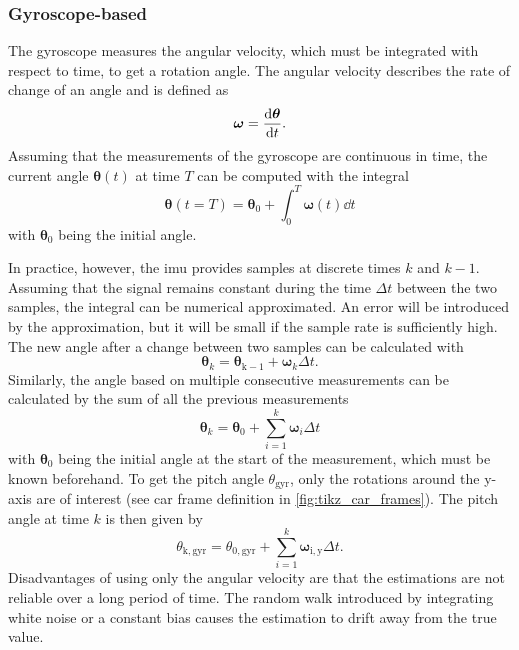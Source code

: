 \subsubsection{Gyroscope-based}
The gyroscope measures the angular velocity, which must be integrated with respect to time, to get a rotation angle.
The angular velocity describes the rate of change of an angle and is defined as
\begin{equation}
    \boldsymbol{\omega}  =  \dv{\boldsymbol{\theta}}{t}.
\end{equation}
Assuming that the measurements of the gyroscope are continuous in time, the current angle $\boldsymbol{\theta}(t)$ at time $T$ can be computed with the integral
\begin{equation}
    \boldsymbol{\theta}(t = T) = \boldsymbol{\theta}_0 + \int_0^T \boldsymbol{\omega}(t)\dd{t}
\end{equation}
with $\boldsymbol{\theta}_0$ being the initial angle.

In practice, however, the \gls{imu} provides samples at discrete times $k$ and $k-1$.
Assuming that the signal remains constant during the time $\Delta t$ between the two samples, the integral can be numerical approximated.
An error will be introduced by the approximation, but it will be small if the sample rate is sufficiently high.
The new angle after a change between two samples can be calculated with
\begin{equation}
    \boldsymbol{\theta}_k = \boldsymbol{\theta}_\mathrm{k - 1} + \boldsymbol{\omega}_k\Delta t.
\end{equation}
Similarly, the angle based on multiple consecutive measurements can be calculated by the sum of all the previous measurements
\begin{equation}
    \boldsymbol{\theta}_k = \boldsymbol{\theta}_0 + \sum_{i = 1}^k \boldsymbol{\omega}_i \Delta t
\end{equation}
with $\boldsymbol{\theta}_0$ being the initial angle at the start of the measurement, which must be known beforehand.
To get the pitch angle $\theta_\mathrm{gyr}$, only the rotations around the y-axis are of interest (see car frame definition in \cref{fig:tikz_car_frames}).
The pitch angle at time $k$ is then given by
\begin{equation}
    \label{eq:ang_from_gyro}
    \theta_\mathrm{k, gyr} = \theta_{0, \mathrm{gyr} } + \sum_{i = 1}^{k} \boldsymbol{\omega}_\mathrm{i, y} \Delta t.
\end{equation}
Disadvantages of using only the angular velocity are that the estimations are not reliable over a long period of time.
The random walk introduced by integrating white noise or a constant bias causes the estimation to drift away from the true value.

